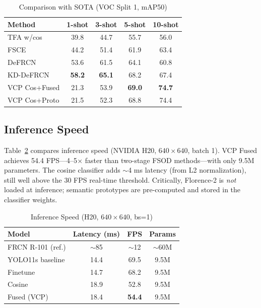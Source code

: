 \documentclass[conference]{IEEEtran}
\begin{document}
\begin{table}[ht]
\centering\footnotesize
\caption{Comparison with SOTA (VOC Split 1, mAP50)}
\label{tab:sota}
\begin{tabular}{lcccc}
\toprule
Method & 1-shot & 3-shot & 5-shot & 10-shot \\
\midrule
TFA w/cos        & 39.8 & 44.7 & 55.7 & 56.0 \\
FSCE             & 44.2 & 51.4 & 61.9 & 63.4 \\
DeFRCN           & 53.6 & 61.5 & 64.1 & 60.8 \\
KD-DeFRCN        & \textbf{58.2} & \textbf{65.1} & 68.2 & 67.4 \\
\midrule
VCP Cos+Fused    & 21.3 & 53.9 & \textbf{69.0} & \textbf{74.7} \\
VCP Cos+Proto    & 21.5 & 52.3 & 68.8 & 74.4 \\
\bottomrule
\end{tabular}
\end{table}

\subsection{Inference Speed}

Table~\ref{tab:fps} compares inference speed (NVIDIA H20, $640\times640$, batch 1). VCP Fused achieves 54.4 FPS---4--5$\times$ faster than two-stage FSOD methods---with only 9.5M parameters. The cosine classifier adds $\sim$4 ms latency (from L2 normalization), still well above the 30 FPS real-time threshold. Critically, Florence-2 is \textit{not} loaded at inference; semantic prototypes are pre-computed and stored in the classifier weights.

\begin{table}[ht]
\centering
\caption{Inference Speed (H20, $640\times640$, bs=1)}
\label{tab:fps}
\begin{tabular}{lccc}
\toprule
Model & Latency (ms) & FPS & Params \\
\midrule
FRCN R-101 (ref.) & $\sim$85 & $\sim$12 & $\sim$60M \\
\midrule
YOLO11s baseline & 14.4 & 69.5 & 9.5M \\
Finetune          & 14.7 & 68.2 & 9.5M \\
Cosine            & 18.9 & 52.8 & 9.5M \\
Fused (VCP)       & 18.4 & \textbf{54.4} & 9.5M \\
\bottomrule
\end{tabular}
\end{table}
\vspace{-6pt}
\end{document}
